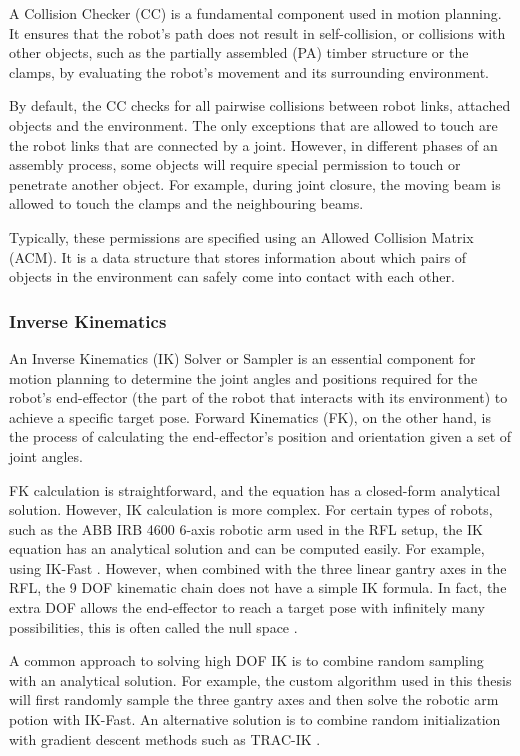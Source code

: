 A Collision Checker (CC) is a fundamental component used in motion planning. It ensures that the robot's path does not result in self-collision, or collisions with other objects, such as the partially assembled (PA) timber structure or the clamps, by evaluating the robot's movement and its surrounding environment. 

By default, the CC checks for all pairwise collisions between robot links, attached objects and the environment. The only exceptions that are allowed to touch are the robot links that are connected by a joint. However, in different phases of an assembly process, some objects will require special permission to touch or penetrate another object. For example, during joint closure, the moving beam is allowed to touch the clamps and the neighbouring beams. 

Typically, these permissions are specified using an Allowed Collision Matrix (ACM). It is a data structure that stores information about which pairs of objects in the environment can safely come into contact with each other.

\subsubsection{Inverse Kinematics}

An Inverse Kinematics (IK) Solver or Sampler is an essential component for motion planning to determine the joint angles and positions required for the robot's end-effector (the part of the robot that interacts with its environment) to achieve a specific target pose. Forward Kinematics (FK), on the other hand, is the process of calculating the end-effector's position and orientation given a set of joint angles.

FK calculation is straightforward, and the equation has a closed-form analytical solution. However, IK calculation is more complex. For certain types of robots, such as the ABB IRB 4600 6-axis robotic arm used in the RFL setup, the IK equation has an analytical solution and can be computed easily. For example, using IK-Fast \parencite{diankovOpenRAVEPlanningArchitecture2008}. However, when combined with the three linear gantry axes in the RFL, the 9 DOF kinematic chain does not have a simple IK formula. In fact, the extra DOF allows the end-effector to reach a target pose with infinitely many possibilities, this is often called the null space \parencite{craigIntroductionRobotics2006}.

A common approach to solving high DOF IK is to combine random sampling with an analytical solution. For example, the custom algorithm used in this thesis will first randomly sample the three gantry axes and then solve the robotic arm potion with IK-Fast. An alternative solution is to combine random initialization with gradient descent methods such as TRAC-IK \parencite{beesonTRACIKOpensourceLibrary2015}. 

